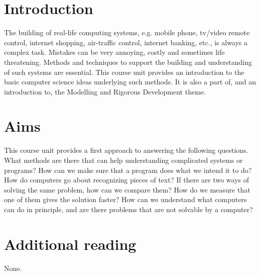 \section*{Introduction}

The building of real-life computing systems, e.g. mobile phone, tv/video remote
control, internet shopping, air-traffic control, internet banking, etc., is
always a complex task. Mistakes can be very annoying, costly and sometimes life
threatening. Methods and techniques to support the building and understanding of
such systems are essential. This course unit provides an introduction to the
basic computer science ideas underlying such methods. It is also a part of, and
an introduction to, the Modelling and Rigorous Development theme.

\section*{Aims}

This course unit provides a first approach to answering the following questions.
What methods are there that can help understanding complicated systems or
programs? How can we make sure that a program does what we intend it to do? How
do computers go about recognizing pieces of text? If there are two ways of
solving the same problem, how can we compare them? How do we measure that one of
them gives the solution faster? How can we understand what computers can do in
principle, and are there problems that are not solvable by a computer?

\section*{Additional reading}

None.
